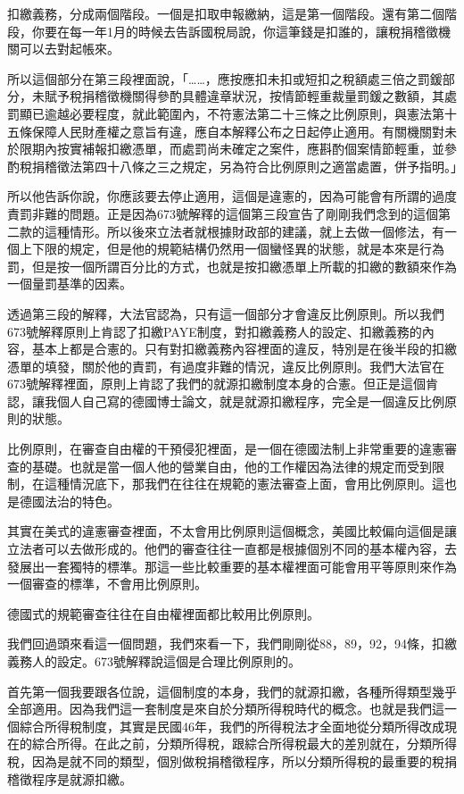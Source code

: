 \documentclass[]{ctexbook}
\begin{document}
扣繳義務，分成兩個階段。一個是扣取申報繳納，這是第一個階段。還有第二個階段，你要在每一年1月的時候去告訴國稅局說，你這筆錢是扣誰的，讓稅捐稽徵機關可以去對起帳來。

所以這個部分在第三段裡面說，「\ldots\ldots，應按應扣未扣或短扣之稅額處三倍之罰鍰部分，未賦予稅捐稽徵機關得參酌具體違章狀況，按情節輕重裁量罰鍰之數額，其處罰顯已逾越必要程度，就此範圍內，不符憲法第二十三條之比例原則，與憲法第十五條保障人民財產權之意旨有違，應自本解釋公布之日起停止適用。有關機關對未於限期內按實補報扣繳憑單，而處罰尚未確定之案件，應斟酌個案情節輕重，並參酌稅捐稽徵法第四十八條之三之規定，另為符合比例原則之適當處置，併予指明。」

所以他告訴你說，你應該要去停止適用，這個是違憲的，因為可能會有所謂的過度責罰非難的問題。正是因為673號解釋的這個第三段宣告了剛剛我們念到的這個第二款的這種情形。所以後來立法者就根據財政部的建議，就上去做一個修法，有一個上下限的規定，但是他的規範結構仍然用一個蠻怪異的狀態，就是本來是行為罰，但是按一個所謂百分比的方式，也就是按扣繳憑單上所載的扣繳的數額來作為一個量罰基準的因素。

透過第三段的解釋，大法官認為，只有這一個部分才會違反比例原則。所以我們673號解釋原則上肯認了扣繳PAYE制度，對扣繳義務人的設定、扣繳義務的內容，基本上都是合憲的。只有對扣繳義務內容裡面的違反，特別是在後半段的扣繳憑單的填發，關於他的責罰，有過度非難的情況，違反比例原則。我們大法官在673號解釋裡面，原則上肯認了我們的就源扣繳制度本身的合憲。但正是這個肯認，讓我個人自己寫的德國博士論文，就是就源扣繳程序，完全是一個違反比例原則的狀態。

比例原則，在審查自由權的干預侵犯裡面，是一個在德國法制上非常重要的違憲審查的基礎。也就是當一個人他的營業自由，他的工作權因為法律的規定而受到限制，在這種情況底下，那我們在往往在規範的憲法審查上面，會用比例原則。這也是德國法治的特色。

其實在美式的違憲審查裡面，不太會用比例原則這個概念，美國比較偏向這個是讓立法者可以去做形成的。他們的審查往往一直都是根據個別不同的基本權內容，去發展出一套獨特的標準。那這一些比較重要的基本權裡面可能會用平等原則來作為一個審查的標準，不會用比例原則。

德國式的規範審查往往在自由權裡面都比較用比例原則。

我們回過頭來看這一個問題，我們來看一下，我們剛剛從88，89，92，94條，扣繳義務人的設定。673號解釋說這個是合理比例原則的。

首先第一個我要跟各位說，這個制度的本身，我們的就源扣繳，各種所得類型幾乎全部適用。因為我們這一套制度是來自於分類所得稅時代的概念。也就是我們這一個綜合所得稅制度，其實是民國46年，我們的所得稅法才全面地從分類所得改成現在的綜合所得。在此之前，分類所得稅，跟綜合所得稅最大的差別就在，分類所得稅，因為是就不同的類型，個別做稅捐稽徵程序，所以分類所得稅的最重要的稅捐稽徵程序是就源扣繳。
\end{document}
